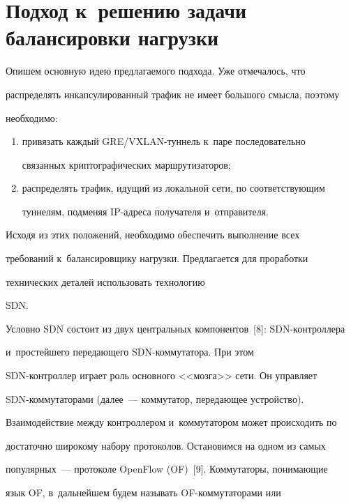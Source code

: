 \section{Подход к~решению задачи балансировки нагрузки}





  Опишем основную идею предлагаемого подхода. Уже отмечалось, что 


распределять инкапсулированный трафик не имеет большого смысла, поэтому 


необходимо:


  \begin{enumerate}[(1)]


\item привязать каждый GRE/VXLAN-тун\-нель к~паре последовательно 


связанных криптографических маршрутизаторов;


\item распределять трафик, идущий из локальной сети, по соответствующим 


туннелям, подменяя IP-ад\-ре\-са получателя и~отправителя.


\end{enumerate}





  Исходя из этих положений, необходимо обеспечить выполнение всех 


требований к~балансировщику нагрузки. Предлагается для проработки 


технических деталей использовать технологию  


SDN. 


Условно SDN со\-сто\-ит из двух центральных компонентов~[8]: SDN-конт\-рол\-ле\-ра 


и~простейшего передающего SDN-ком\-му\-та\-то\-ра. При этом  


SDN-конт\-рол\-лер играет роль основного <<мозга>> сети. Он управляет  


SDN-ком\-му\-та\-то\-ра\-ми (далее~--- коммутатор, передающее устройство). 


Взаимодействие между контроллером и~коммутатором может происходить по 


достаточно широкому набору протоколов. Остановимся на одном из самых 


популярных~--- протоколе OpenFlow (OF)~[9]. Коммутаторы, понимающие 


язык OF, в~дальнейшем будем называть OF-ком\-му\-та\-то\-ра\-ми или 



